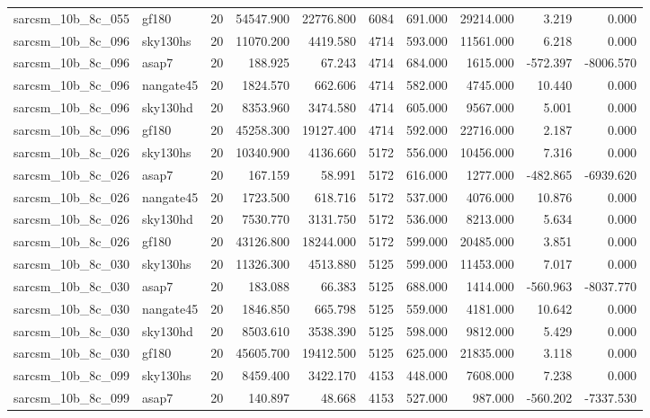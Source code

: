 \begin{longtable}{llrrrrrrrr}
sarcsm\_10b\_8c\_055 & gf180 & 20 & 54547.900 & 22776.800 & 6084 & 691.000 & 29214.000 & 3.219 & 0.000 \\
sarcsm\_10b\_8c\_096 & sky130hs & 20 & 11070.200 & 4419.580 & 4714 & 593.000 & 11561.000 & 6.218 & 0.000 \\
sarcsm\_10b\_8c\_096 & asap7 & 20 & 188.925 & 67.243 & 4714 & 684.000 & 1615.000 & -572.397 & -8006.570 \\
sarcsm\_10b\_8c\_096 & nangate45 & 20 & 1824.570 & 662.606 & 4714 & 582.000 & 4745.000 & 10.440 & 0.000 \\
sarcsm\_10b\_8c\_096 & sky130hd & 20 & 8353.960 & 3474.580 & 4714 & 605.000 & 9567.000 & 5.001 & 0.000 \\
sarcsm\_10b\_8c\_096 & gf180 & 20 & 45258.300 & 19127.400 & 4714 & 592.000 & 22716.000 & 2.187 & 0.000 \\
sarcsm\_10b\_8c\_026 & sky130hs & 20 & 10340.900 & 4136.660 & 5172 & 556.000 & 10456.000 & 7.316 & 0.000 \\
sarcsm\_10b\_8c\_026 & asap7 & 20 & 167.159 & 58.991 & 5172 & 616.000 & 1277.000 & -482.865 & -6939.620 \\
sarcsm\_10b\_8c\_026 & nangate45 & 20 & 1723.500 & 618.716 & 5172 & 537.000 & 4076.000 & 10.876 & 0.000 \\
sarcsm\_10b\_8c\_026 & sky130hd & 20 & 7530.770 & 3131.750 & 5172 & 536.000 & 8213.000 & 5.634 & 0.000 \\
sarcsm\_10b\_8c\_026 & gf180 & 20 & 43126.800 & 18244.000 & 5172 & 599.000 & 20485.000 & 3.851 & 0.000 \\
sarcsm\_10b\_8c\_030 & sky130hs & 20 & 11326.300 & 4513.880 & 5125 & 599.000 & 11453.000 & 7.017 & 0.000 \\
sarcsm\_10b\_8c\_030 & asap7 & 20 & 183.088 & 66.383 & 5125 & 688.000 & 1414.000 & -560.963 & -8037.770 \\
sarcsm\_10b\_8c\_030 & nangate45 & 20 & 1846.850 & 665.798 & 5125 & 559.000 & 4181.000 & 10.642 & 0.000 \\
sarcsm\_10b\_8c\_030 & sky130hd & 20 & 8503.610 & 3538.390 & 5125 & 598.000 & 9812.000 & 5.429 & 0.000 \\
sarcsm\_10b\_8c\_030 & gf180 & 20 & 45605.700 & 19412.500 & 5125 & 625.000 & 21835.000 & 3.118 & 0.000 \\
sarcsm\_10b\_8c\_099 & sky130hs & 20 & 8459.400 & 3422.170 & 4153 & 448.000 & 7608.000 & 7.238 & 0.000 \\
sarcsm\_10b\_8c\_099 & asap7 & 20 & 140.897 & 48.668 & 4153 & 527.000 & 987.000 & -560.202 & -7337.530 \\

\end{longtable}
